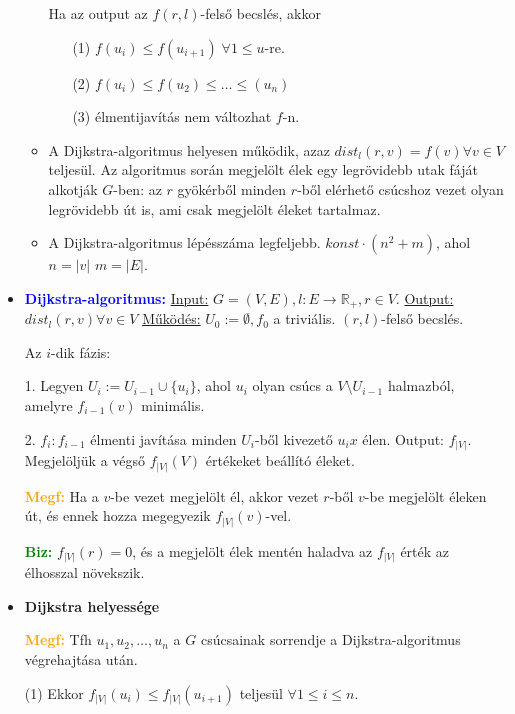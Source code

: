 \documentclass[../../szobeli.tex]{subfiles}
\begin{document}
\begin{itemize}
\begin{itemize}
            Ha az output az $f(r,l)$-felső becslés, akkor \begin{itemize}
                \item[(1)] $f(u_i) \leq f(u_{i+1}) \; \forall 1 \leq u$-re.
                \item[(2)] $f(u_i) \leq f(u_2) \leq \dots \leq (u_n)$
                \item[(3)] élmentijavítás nem változhat $f$-n.
            \end{itemize}
            \item A Dijkstra-algoritmus helyesen működik, azaz $dist_l(r,v)=f(v) \forall v\in V$ teljesül. Az algoritmus során megjelölt élek egy legrövidebb utak fáját alkotják $G$-ben: az $r$ gyökérből minden $r$-ből elérhető csúcshoz vezet olyan legrövidebb út is, ami csak megjelölt éleket tartalmaz. 
            \item A Dijkstra-algoritmus lépésszáma legfeljebb. $konst \cdot (n^2+m)$, ahol $n=|v|$ $m=|E|$.
        \end{itemize}
        \item \textbf{\textcolor{blue}{Dijkstra-algoritmus:}} \underline{Input:} $G = (V,E), l : E \rightarrow \mathbb{R}_+, r \in V$. \underline{Output:} $dist_l(r,v) \forall v \in V$ \underline{Működés:} $U_0 := \emptyset, f_0$ a triviális. $(r,l)$-felső becslés. 
				
            Az $i$-dik fázis:

            1. Legyen $U_i := U_{i-1} \cup \{u_i\}$, ahol $u_i$ olyan csúcs a $V  \setminus  U_{i-1}$ halmazból, amelyre $f_{i-1}(v)$ minimális.

            2. $f_i:f_{i-1}$ élmenti javítása minden $U_i$-ből kivezető $u_ix$ élen. Output: $f_{|V|}$. Megjelöljük a végső $f_{|V|}(V)$ értékeket beállító éleket.
            
            \textcolor{orange}{\textbf{Megf:}} Ha a $v$-be vezet megjelölt él, akkor vezet $r$-ből $v$-be megjelölt éleken út, és ennek hozza megegyezik $f_{|V|} (v)$-vel.

            \textcolor{green}{\textbf{Biz:}} $f_{|V|} (r) = 0$, és a megjelölt élek mentén haladva az $f_{|V|}$ érték az élhosszal növekszik.  

        \item \textbf{Dijkstra helyessége}
				
        \textcolor{orange}{\textbf{Megf:}} Tfh $u_1, u_2, \dots, u_n$ a $G$ csúcsainak sorrendje a Dijkstra-algoritmus végrehajtása után. 

        (1) Ekkor $f_{|V|}(u_i) \leq f_{|V|}(u_{i+1})$ teljesül $\forall 1 \leq i \leq n$.


\end{itemize}
\end{document}

